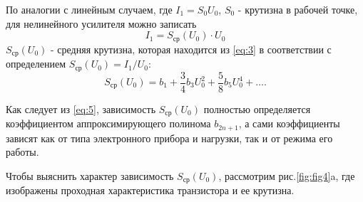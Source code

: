 По аналогии с линейным случаем, где $I_1=S_0U_0$, $S_0$ - крутизна в рабочей точке, для нелинейного усилителя можно записать 
\begin{equation}
I_1=S_\text{ср}(U_0)\cdot U_0
\label{eq:4}
\end{equation}
$S_\text{ср}(U_0)$ - средняя крутизна, которая находится из \eqref{eq:3} в соответствии с определением $S_\text{ср}(U_0)=I_1/U_0$:
\begin{equation}
S_\text{ср}(U_0)=b_1+\frac{3}{4}b_3U_0^2+\frac{5}{8}b_5U_0^4+\ldots.
\label{eq:5}
\end{equation}

Как следует из \eqref{eq:5}, зависимость $S_\text{ср}(U_0)$ полностью определяется коэффициентом аппроксимирующего полинома $b_{2n+1}$, а сами коэффициенты зависят как от типа электронного прибора и нагрузки, так и от режима его работы.

Чтобы выяснить характер зависимость $S_\text{ср}(U_0)$, рассмотрим рис.\ref{fig:fig4}a, где изображены проходная характеристика транзистора и ее крутизна.

